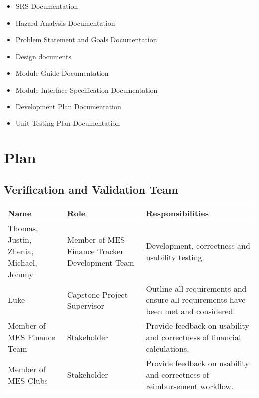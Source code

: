 \documentclass[12pt, titlepage]{article}
\begin{document}

\begin{itemize}
  \item SRS Documentation
  \item Hazard Analysis Documentation
  \item Problem Statement and Goals Documentation
  \item Design documents
  \item Module Guide Documentation
  \item Module Interface Specification Documentation
  \item Development Plan Documentation
  \item Unit Testing Plan Documentation
\end{itemize}



\section{Plan}


\subsection{Verification and Validation Team}

\noindent
\begin{tabularx}{\textwidth}{>{\raggedright\arraybackslash}p{3.5cm} >{\raggedright\arraybackslash}p{3.5cm} X}
\toprule
\textbf{Name} & \textbf{Role} & \textbf{Responsibilities}\\
\midrule
Thomas, Justin, Zhenia, Michael, Johnny & Member of MES Finance Tracker Development Team & Development, correctness and usability testing.\\
Luke & Capstone Project Supervisor & Outline all requirements and ensure all requirements have been met and considered.\\
Member of MES Finance Team & Stakeholder & Provide feedback on usability and correctness of financial calculations.\\
Member of MES Clubs & Stakeholder & Provide feedback on usability and correctness of reimbursement workflow.\\
\bottomrule
\end{tabularx}
\end{document}

